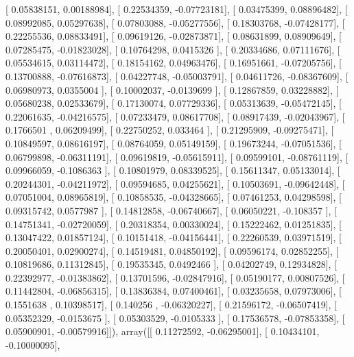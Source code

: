\documentclass{article}
\begin{document}
       [ 0.05838151,  0.00188984],
       [ 0.22534359, -0.07723181],
       [ 0.03475399,  0.08896482],
       [ 0.08992085,  0.05297638],
       [ 0.07803088, -0.05277556],
       [ 0.18303768, -0.07428177],
       [ 0.22255536,  0.08833491],
       [ 0.09619126, -0.02873871],
       [ 0.08631899,  0.08909649],
       [ 0.07285475, -0.01823028],
       [ 0.10764298,  0.0415326 ],
       [ 0.20334686,  0.07111676],
       [ 0.05534615,  0.03114472],
       [ 0.18154162,  0.04963476],
       [ 0.16951661, -0.07205756],
       [ 0.13700888, -0.07616873],
       [ 0.04227748, -0.05003791],
       [ 0.04611726, -0.08367609],
       [ 0.06980973,  0.0355004 ],
       [ 0.10002037, -0.0139699 ],
       [ 0.12867859,  0.03228882],
       [ 0.05680238,  0.02533679],
       [ 0.17130074,  0.07729336],
       [ 0.05313639, -0.05472145],
       [ 0.22061635, -0.04216575],
       [ 0.07233479,  0.08617708],
       [ 0.08917439, -0.02043967],
       [ 0.1766501 ,  0.06209499],
       [ 0.22750252,  0.033464  ],
       [ 0.21295909, -0.09275471],
       [ 0.10849597,  0.08616197],
       [ 0.08764059,  0.05149159],
       [ 0.19673244, -0.07051536],
       [ 0.06799898, -0.06311191],
       [ 0.09619819, -0.05615911],
       [ 0.09599101, -0.08761119],
       [ 0.09966059, -0.1086363 ],
       [ 0.10801979,  0.08339525],
       [ 0.15611347,  0.05133014],
       [ 0.20244301, -0.04211972],
       [ 0.09594685,  0.04255621],
       [ 0.10503691, -0.09642448],
       [ 0.07051004,  0.08965819],
       [ 0.10858535, -0.04328665],
       [ 0.07461253,  0.04298598],
       [ 0.09315742,  0.0577987 ],
       [ 0.14812858, -0.06740667],
       [ 0.06050221, -0.108357  ],
       [ 0.14751341, -0.02720059],
       [ 0.20318354,  0.00330024],
       [ 0.15222462,  0.01251835],
       [ 0.13047422,  0.01857124],
       [ 0.10151418, -0.04156441],
       [ 0.22260539,  0.03971519],
       [ 0.20050401,  0.02900274],
       [ 0.14519481,  0.04850192],
       [ 0.09596174,  0.02852255],
       [ 0.10819686,  0.11312845],
       [ 0.19535345,  0.0492466 ],
       [ 0.04202749,  0.12934828],
       [ 0.22392977, -0.01383862],
       [ 0.13701596, -0.02847916],
       [ 0.05190177,  0.00807526],
       [ 0.11442804, -0.06856315],
       [ 0.13836384,  0.07400461],
       [ 0.03235658,  0.07973006],
       [ 0.1551638 ,  0.10398517],
       [ 0.140256  , -0.06320227],
       [ 0.21596172, -0.06507419],
       [ 0.05352329, -0.0153675 ],
       [ 0.05303529, -0.0105333 ],
       [ 0.17536578, -0.07853358],
       [ 0.05900901, -0.00579916]]), array([[ 0.11272592, -0.06295001],
       [ 0.10434101, -0.10000095],
\end{document}
